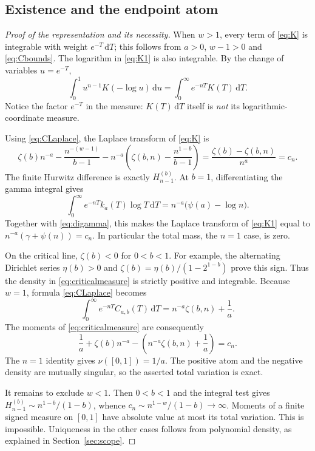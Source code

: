 \documentclass[11pt]{article}
\numberwithin{equation}{section}
\theoremstyle{definition}\newtheorem{definition}[theorem]{Definition}
\theoremstyle{remark}\newtheorem{remark}[theorem]{Remark}
\newcommand{\dd}{\,\mathrm d}
\begin{document}
\subsection{Existence and the endpoint atom}
\begin{proof}[Proof of the representation and its necessity]
When $w>1$, every term of \eqref{eq:K} is integrable with weight
$e^{-T}\dd T$; this follows from $a>0$, $w-1>0$ and
\eqref{eq:Cbounds}. The logarithm in \eqref{eq:K1} is also integrable.
By the change of variables $u=e^{-T}$,
\[
 \int_0^1u^{n-1}K(-\log u)\dd u
 =\int_0^\infty e^{-nT}K(T)\dd T.
\]
Notice the factor $e^{-T}$ in the measure: $K(T)\dd T$ itself is
\emph{not} its logarithmic-coordinate measure.

Using \eqref{eq:CLaplace}, the Laplace transform of \eqref{eq:K} is
\[
 \zeta(b)n^{-a}-\frac{n^{-(w-1)}}{b-1}
 -n^{-a}\left(\zeta(b,n)-\frac{n^{1-b}}{b-1}\right)
 =\frac{\zeta(b)-\zeta(b,n)}{n^a}=c_n.
\]
The finite Hurwitz difference is exactly $H_{n-1}^{(b)}$.
At $b=1$, differentiating the gamma integral gives
\[
 \int_0^\infty e^{-nT}k_a(T)\log T\dd T
 =n^{-a}\bigl(\psi(a)-\log n\bigr).
\]
Together with \eqref{eq:digamma}, this makes the Laplace transform
of \eqref{eq:K1} equal to $n^{-a}(\gamma+\psi(n))=c_n$.
In particular the total mass, the $n=1$ case, is zero.

On the critical line, $\zeta(b)<0$ for $0<b<1$.
For example, the alternating Dirichlet series $\eta(b)>0$ and
$\zeta(b)=\eta(b)/(1-2^{1-b})$ prove this sign. Thus the density
in \eqref{eq:criticalmeasure} is strictly positive and integrable.
Because $w=1$, formula \eqref{eq:CLaplace} becomes
\[
 \int_0^\infty e^{-nT}C_{a,b}(T)\dd T
 =n^{-a}\zeta(b,n)+\frac1a.
\]
The moments of \eqref{eq:criticalmeasure} are consequently
\[
 \frac1a+\zeta(b)n^{-a}
 -\left(n^{-a}\zeta(b,n)+\frac1a\right)=c_n.
\]
The $n=1$ identity gives $\nu([0,1])=1/a$.
The positive atom and the negative density are mutually singular,
so the asserted total variation is exact.

It remains to exclude $w<1$. Then $0<b<1$ and the integral test gives
$H_{n-1}^{(b)}\sim n^{1-b}/(1-b)$, whence
$c_n\sim n^{1-w}/(1-b)\to\infty$. Moments of a finite signed measure
on $[0,1]$ have absolute value at most its total variation. This is
impossible. Uniqueness in the other cases follows from polynomial
density, as explained in Section~\ref{sec:scope}.
\end{proof}
\end{document}
